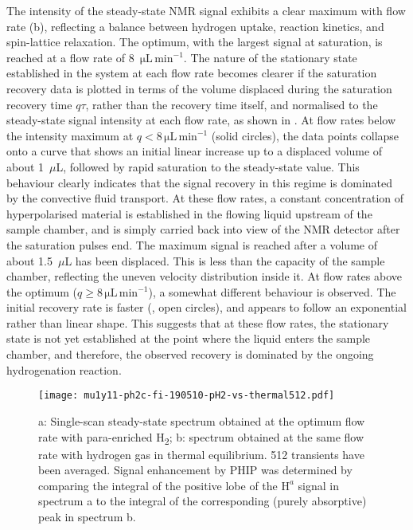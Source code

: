 The intensity of the steady-state NMR signal exhibits a clear maximum with flow
rate (b), reflecting a balance between hydrogen uptake,
reaction kinetics, and spin-lattice relaxation. The optimum, with the largest signal at
saturation, is reached at a flow rate of 8~$\mathrm{\mu L\,\text{min}^{-1}}$.
The nature of the stationary state established in the system at each
flow rate becomes clearer if the saturation recovery data is plotted in terms
of the volume displaced during the saturation recovery time $q\tau$, rather
than the recovery time itself, and normalised to the steady-state signal intensity
at each flow rate, as shown in . At flow rates below
the intensity maximum at $q<8\,\mathrm{\mu L\,\text{min}^{-1}}$ (solid
circles),
the data points collapse onto a curve that shows an initial linear increase
up to a displaced volume of about 1~$\mu$L, followed by rapid saturation to the
steady-state value. This behaviour clearly indicates that the
signal recovery in this regime is dominated by the convective fluid transport.
At these flow rates, a constant concentration of
hyperpolarised material is established in the flowing liquid upstream of the
sample chamber, and is simply carried back into view of the NMR detector
after the saturation pulses end.
The maximum signal is reached after a volume
of about 1.5~$\mu$L has been displaced. This is less than the capacity
of the sample chamber, reflecting the uneven velocity distribution inside it.
At flow rates above the optimum ($q\ge 8\,\mathrm{\mu L\,\text{min}^{-1}}$),
a somewhat different behaviour is observed. The initial recovery rate is
faster (, open circles), and appears to follow
an exponential rather than linear shape. This suggests that at these flow
rates, the stationary state is not yet established at the point where the
liquid enters the sample chamber, and therefore, the observed recovery
is dominated by the ongoing hydrogenation reaction.

\begin{figure}
  \begin{center}
    \texttt{[image: mu1y11-ph2c-fi-190510-pH2-vs-thermal512.pdf]}
  \end{center}
  \caption{	a: Single-scan steady-state spectrum obtained at the optimum flow rate
  	with para-enriched H\textsubscript{2}; b: spectrum obtained at the same flow
    rate with hydrogen gas
  	in thermal equilibrium. 512 transients have been averaged. Signal enhancement by
  	PHIP was determined by comparing the integral of the positive lobe of
    the $\mathrm{H}^a$ signal in spectrum a to the
  	integral of the corresponding (purely absorptive) peak in spectrum b.}
  \label{fig:pH2-vs-thermal512}
\end{figure}

